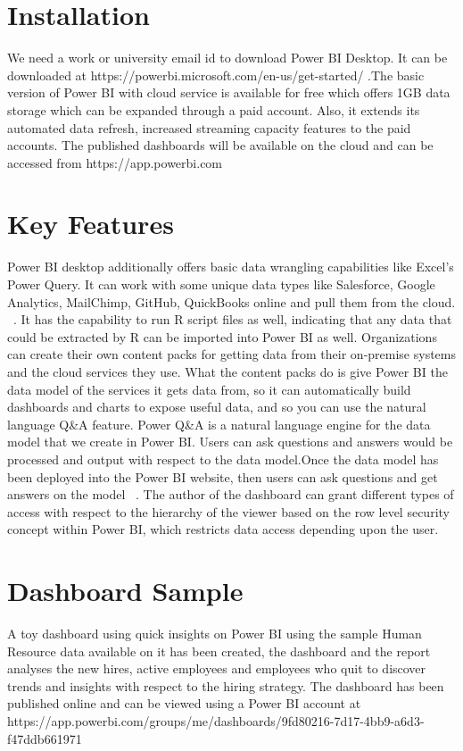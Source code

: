 \section{Installation}
We need a work or university email id to download Power BI Desktop. It can be 
downloaded at https://powerbi.microsoft.com/en-us/get-started/ .The basic 
version of Power BI with cloud service is available for free which offers 
1GB data storage which can be expanded through a paid account. Also, it extends
its automated data refresh, increased streaming capacity features to the paid 
accounts. The published dashboards will be available on the cloud and can be 
accessed from https://app.powerbi.com
 
\section{Key Features}
Power BI desktop additionally offers basic data wrangling capabilities like 
Excel's Power Query. It can work with some unique data types like Salesforce, 
Google Analytics, MailChimp, GitHub, QuickBooks online and pull them from the 
cloud. ~\cite{hid-sp18-418-powerbi-intro}.
It has the capability to run R script files as well, indicating that any data 
that could be extracted by R can be imported into Power BI as well. 
Organizations can create their own content packs for getting data from their 
on-premise systems and the cloud services they use. What the content packs do 
is give Power BI the data model of the services it gets data from, so it can 
automatically build dashboards and charts to expose useful data, and so you 
can use the natural language Q&A feature. Power Q&A is a natural language 
engine for the data model that we create in Power BI. Users can ask questions 
and answers would be processed and output with respect to the data model.Once 
the data model has been deployed into the Power BI website, then users can ask 
questions and get answers on the model ~\cite{hid-sp18-418-powerbi-intro}.
The author of the dashboard can grant different types of access with respect 
to the hierarchy of the viewer based on the row level security concept within 
Power BI, which restricts data access depending upon the user.

 
\section{Dashboard Sample}
A toy dashboard using quick insights on Power BI using the sample Human 
Resource data available on it has been created, the dashboard and the report 
analyses the new hires, active employees and employees who quit to discover 
trends and insights with respect to the hiring strategy. The dashboard has 
been published online and can be viewed using a Power BI account at \\ 
https://app.powerbi.com/groups/me/dashboards/9fd80216-7d17-4bb9-a6d3-f47ddb661971
\\

